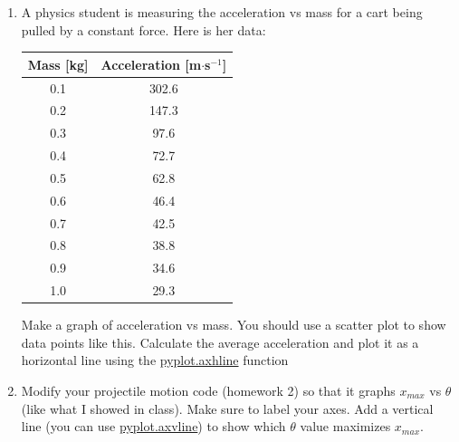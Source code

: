 \documentclass{article}
\begin{document}
\begin{enumerate}
	\item A physics student is measuring the acceleration vs mass for a cart being pulled by a constant force. Here is her data:\\
	\begin{center}
	\begin{tabular}{|c|c|}
		\hline
		Mass [kg]&Acceleration [m$\cdot$s$^{-1}$]\\
		\hline
		0.1&302.6\\
		\hline
		0.2&147.3\\
		\hline 
		0.3&97.6\\
		\hline 
		0.4&72.7\\
		\hline
		0.5&62.8\\
		\hline
		0.6&46.4\\
		\hline 
		0.7&42.5\\
		\hline
		0.8&38.8\\
		\hline
		0.9&34.6\\
		\hline
		1.0&29.3\\
		\hline
	\end{tabular}
	\end{center}
	Make a graph of acceleration vs mass. You should use a scatter plot to show data points like this. Calculate the average acceleration and plot it as a horizontal line using the \href{https://matplotlib.org/stable/api/_as_gen/matplotlib.pyplot.axhline.html}{pyplot.axhline} function
	\item Modify your projectile motion code (homework 2) so that it graphs $x_{max}$ vs $\theta$ (like what I showed in class). Make sure to label your axes. Add a vertical line (you can use \href{https://matplotlib.org/stable/api/_as_gen/matplotlib.pyplot.axvline.html}{pyplot.axvline}) to show which $\theta$ value maximizes $x_{max}$.
\end{enumerate}
\end{document}
